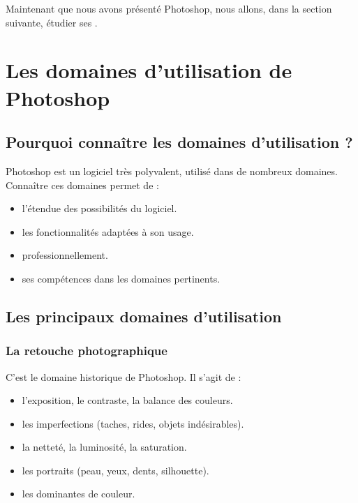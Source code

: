 Maintenant que nous avons présenté Photoshop, nous allons, dans la section suivante, étudier ses .

\section{Les domaines d'utilisation de Photoshop}

\subsection{Pourquoi connaître les domaines d'utilisation ?}

Photoshop est un logiciel très polyvalent, utilisé dans de nombreux domaines. Connaître ces domaines permet de :

\begin{itemize}
    \item {} l'étendue des possibilités du logiciel.
    \item {} les fonctionnalités adaptées à son usage.
    \item {} professionnellement.
    \item {} ses compétences dans les domaines pertinents.
\end{itemize}

\subsection{Les principaux domaines d'utilisation}

\subsubsection{La retouche photographique}

C'est le domaine historique de Photoshop. Il s'agit de :

\begin{itemize}
    \item {} l'exposition, le contraste, la balance des couleurs.
    \item {} les imperfections (taches, rides, objets indésirables).
    \item {} la netteté, la luminosité, la saturation.
    \item {} les portraits (peau, yeux, dents, silhouette).
    \item {} les dominantes de couleur.
\end{itemize}

